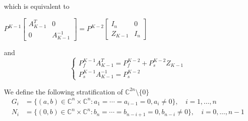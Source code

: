 \documentclass[10pt]{amsart}
\theoremstyle{remark}
\begin{document}
which is equivalent to
\begin{center}
    $P^{K-1} \left[\begin{array}{ccc} A^T_{K-1} & 0 \\ 0 & A^{-1}_{K-1}\end{array}\right] = P^{K-2} \left[\begin{array}{ccc} I_n & 0 \\ Z_{K-1} & I_n\end{array}\right]$
\end{center}
and
\begin{equation}\label{equa-3}
    \begin{cases}
    P^{K-1}_f A^T_{K-1} = P^{K-2}_f+P^{K-2}_s Z_{K-1}  \\
      P^{K-1}_s A^{-1}_{K-1} = P^{K-2}_{s}
\end{cases}
\end{equation}

We define the following stratification of $\mathbb{C}^{2n} \setminus \{0 \}$
\begin{align*}
    G_i &=  \lbrace (a,b) \in \mathbb{C}^n \times \mathbb{C}^n : a_1 =  \cdots = a_{i-1} =0, a_i \neq 0 \rbrace , \quad i = 1, \dots, n \\
    N_i &= \lbrace (0,b) \in \mathbb{C}^n\times \mathbb{C}^n: b_n = \cdots = b_{n-i+1} =  0, b_{n-i} \neq 0  \rbrace, \quad i = 0, \dots, n-1
\end{align*}
\end{document}
